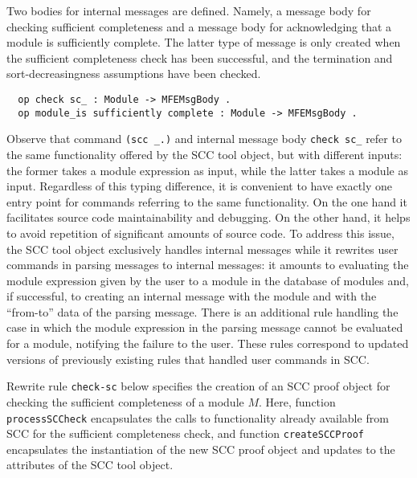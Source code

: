 Two bodies for internal messages are defined. Namely, a message body
for checking sufficient completeness and a message body
for acknowledging that a module is sufficiently
complete. The latter type of message is only created
when the sufficient completeness check has been successful, and the termination
and sort-decreasingness assumptions have been checked.

\begin{small}
\begin{verbatim}
  op check sc_ : Module -> MFEMsgBody .
  op module_is sufficiently complete : Module -> MFEMsgBody .
\end{verbatim}
\end{small}
%
Observe that command \verb~(scc _.)~ and internal message
body \verb~check sc_~ refer to the same functionality
offered by the SCC tool object, but with different inputs:
the former takes a
module expression as input, while the latter 
takes a {module} as input.
Regardless of this typing difference, 
it is convenient to have exactly one entry point
for commands referring to the same functionality. On the
one hand it facilitates source code maintainability
and debugging. On the other hand, it helps to avoid
repetition of significant amounts of source code.
To address this issue, the SCC tool object 
exclusively handles internal messages while it rewrites 
user commands in parsing messages to internal messages:
it amounts to evaluating the module expression given by the user 
to a module in the database of modules and, if successful,
to creating an internal message with the module
and with the ``from-to'' data of the parsing message.
There is an additional rule handling the case in which
the module expression in the parsing message cannot
be evaluated for a module, notifying the failure to the user.
These rules correspond to updated
versions of previously existing rules 
that handled user commands in SCC.

Rewrite rule {\tt check-sc} below specifies the creation of
an SCC proof object for
checking the sufficient completeness of a module $M$.
Here, function {\tt processSCCheck}
encapsulates the calls to functionality already available from SCC
for the sufficient completeness check,
and function {\tt createSCCProof} encapsulates the 
instantiation of the new SCC proof object and
updates to the attributes of the SCC tool object.

